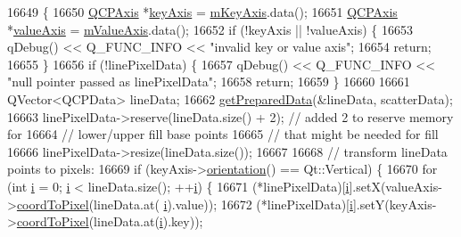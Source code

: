\begin{DoxyCode}
16649                                                                     \{
16650   \hyperlink{class_q_c_p_axis}{QCPAxis} *\hyperlink{class_q_c_p_abstract_plottable_a72c7a09c22963f2c943f07112b311103}{keyAxis} = \hyperlink{class_q_c_p_abstract_plottable_a426f42e254d0f8ce5436a868c61a6827}{mKeyAxis}.data();
16651   \hyperlink{class_q_c_p_axis}{QCPAxis} *\hyperlink{class_q_c_p_abstract_plottable_a3106f9d34d330a6097a8ec5905e5b519}{valueAxis} = \hyperlink{class_q_c_p_abstract_plottable_a2901452ca4aea911a1827717934a4bda}{mValueAxis}.data();
16652   \textcolor{keywordflow}{if} (!keyAxis || !valueAxis) \{
16653     qDebug() << Q\_FUNC\_INFO << \textcolor{stringliteral}{"invalid key or value axis"};
16654     \textcolor{keywordflow}{return};
16655   \}
16656   \textcolor{keywordflow}{if} (!linePixelData) \{
16657     qDebug() << Q\_FUNC\_INFO << \textcolor{stringliteral}{"null pointer passed as linePixelData"};
16658     \textcolor{keywordflow}{return};
16659   \}
16660 
16661   QVector<QCPData> lineData;
16662   \hyperlink{class_q_c_p_graph_ab420b46ba638dc3252439fe16687b244}{getPreparedData}(&lineData, scatterData);
16663   linePixelData->reserve(lineData.size() + 2); \textcolor{comment}{// added 2 to reserve memory for}
16664                                                \textcolor{comment}{// lower/upper fill base points}
16665                                                \textcolor{comment}{// that might be needed for fill}
16666   linePixelData->resize(lineData.size());
16667 
16668   \textcolor{comment}{// transform lineData points to pixels:}
16669   \textcolor{keywordflow}{if} (keyAxis->\hyperlink{class_q_c_p_axis_a57483f2f60145ddc9e63f3af53959265}{orientation}() == Qt::Vertical) \{
16670     \textcolor{keywordflow}{for} (\textcolor{keywordtype}{int} \hyperlink{_comparision_pictures_2_createtest_image_8m_a6f6ccfcf58b31cb6412107d9d5281426}{i} = 0; \hyperlink{_comparision_pictures_2_createtest_image_8m_a6f6ccfcf58b31cb6412107d9d5281426}{i} < lineData.size(); ++\hyperlink{_comparision_pictures_2_createtest_image_8m_a6f6ccfcf58b31cb6412107d9d5281426}{i}) \{
16671       (*linePixelData)[\hyperlink{_comparision_pictures_2_createtest_image_8m_a6f6ccfcf58b31cb6412107d9d5281426}{i}].setX(valueAxis->\hyperlink{class_q_c_p_axis_a985ae693b842fb0422b4390fe36d299a}{coordToPixel}(lineData.at(
      \hyperlink{_comparision_pictures_2_createtest_image_8m_a6f6ccfcf58b31cb6412107d9d5281426}{i}).value));
16672       (*linePixelData)[\hyperlink{_comparision_pictures_2_createtest_image_8m_a6f6ccfcf58b31cb6412107d9d5281426}{i}].setY(keyAxis->\hyperlink{class_q_c_p_axis_a985ae693b842fb0422b4390fe36d299a}{coordToPixel}(lineData.at(\hyperlink{_comparision_pictures_2_createtest_image_8m_a6f6ccfcf58b31cb6412107d9d5281426}{i}).key));

\end{DoxyCode}
